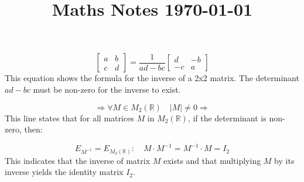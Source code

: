 \documentclass{article}
\title{Maths Notes \today}
\begin{document}
\maketitle
\[
\begin{bmatrix}
a & b \\
c & d
\end{bmatrix}
=
\frac{1}{ad - bc}
\begin{bmatrix}
d & -b \\
-c & a
\end{bmatrix}
\]
This equation shows the formula for the inverse of a 2x2 matrix. The determinant \(ad - bc\) must be non-zero for the inverse to exist.

\[
\Rightarrow \forall M \in M_2(\mathbb{R}) \quad |M| \neq 0 \Rightarrow
\]
This line states that for all matrices \(M\) in \(M_2(\mathbb{R})\), if the determinant is non-zero, then:

\[
E_{M^{-1}} = E_{M_2(\mathbb{R})} : \quad M \cdot M^{-1} = M^{-1} \cdot M = I_2
\]
This indicates that the inverse of matrix \(M\) exists and that multiplying \(M\) by its inverse yields the identity matrix \(I_2\).
\end{document}
